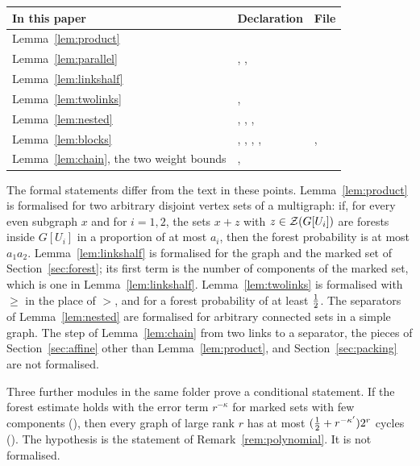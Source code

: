 \begin{center}\begin{minipage}{\linewidth}\centering\small
{}\label{tab:sharpsteps}
\smallskip
\renewcommand{\arraystretch}{1.0}
\begin{tabular}{@{}L{4.6cm}L{6.4cm}L{4.6cm}@{}}
\toprule
In this paper & Declaration & File \\
\midrule
Lemma~\ref{lem:product} &  &  \\
Lemma~\ref{lem:parallel} & , ,
   &  \\
Lemma~\ref{lem:linkshalf} &  &  \\
Lemma~\ref{lem:twolinks} & ,  &
   \\
Lemma~\ref{lem:nested} & , , ,
   &  \\
Lemma~\ref{lem:blocks} & , ,
  , ,  &
  ,  \\
Lemma~\ref{lem:chain}, the two weight bounds & ,  &
   \\
\bottomrule
\end{tabular}
\end{minipage}\end{center}

The formal statements differ from the text in these points. Lemma~\ref{lem:product} is formalised
for two arbitrary disjoint vertex sets of a multigraph: if, for every even subgraph $x$ and for
$i=1,2$, the sets $x+z$ with $z\in\mathcal{Z}(G[U_i])$ are forests inside $G[U_i]$ in a proportion of at
most $a_i$, then the forest probability is at most $a_1a_2$. Lemma~\ref{lem:linkshalf} is formalised
for the graph and the marked set of Section~\ref{sec:forest}; its first term is the number of
components of the marked set, which is one in Lemma~\ref{lem:linkshalf}. Lemma~\ref{lem:twolinks} is
formalised with $\ge$ in the place of $>$, and for a forest probability of at least $\tfrac12$. The
separators of Lemma~\ref{lem:nested} are formalised for arbitrary connected sets in a simple graph.
The step of Lemma~\ref{lem:chain} from two links to a separator, the pieces of
Section~\ref{sec:affine} other than Lemma~\ref{lem:product}, and Section~\ref{sec:packing} are not
formalised.

Three further modules in the same folder prove a conditional statement. If the forest estimate
holds with the error term $r^{-\kappa}$ for marked sets with few components
(), then every graph of large rank $r$ has at most
$(\tfrac12+r^{-\kappa'})2^{r}$ cycles (). The
hypothesis is the statement of Remark~\ref{rem:polynomial}. It is not formalised.
